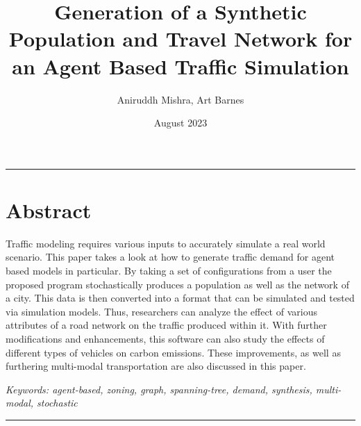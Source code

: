 \documentclass[11pt]{article}
\title{\vspace{-5em}\Huge Generation of a Synthetic Population and Travel Network for an Agent Based Traffic Simulation}
\author{\small Aniruddh Mishra, Art Barnes}
\affil{\textit{Institute for Computing in Research}}
\date{\vspace{-0.9em}\small August 2023}
\begin{document}
\maketitle

\hrule

\section*{Abstract}

\quad Traffic modeling requires various inputs to accurately simulate a real world scenario. This paper takes a look at how to generate traffic demand for agent based models in particular. By taking a set of configurations from a user the proposed program stochastically produces a population as well as the network of a city. This data is then converted into a format that can be simulated and tested via simulation models. Thus, researchers can analyze the effect of various attributes of a road network on the traffic produced within it. With further modifications and enhancements, this software can also study the effects of different types of vehicles on carbon emissions. These improvements, as well as furthering multi-modal transportation are also discussed in this paper.

\vspace{1em}

\raggedright\textit{Keywords: agent-based, zoning, graph, spanning-tree, demand, synthesis, multi-modal, stochastic}

\vspace{1em}

\hrule

\vspace{0.7em}
\end{document}
